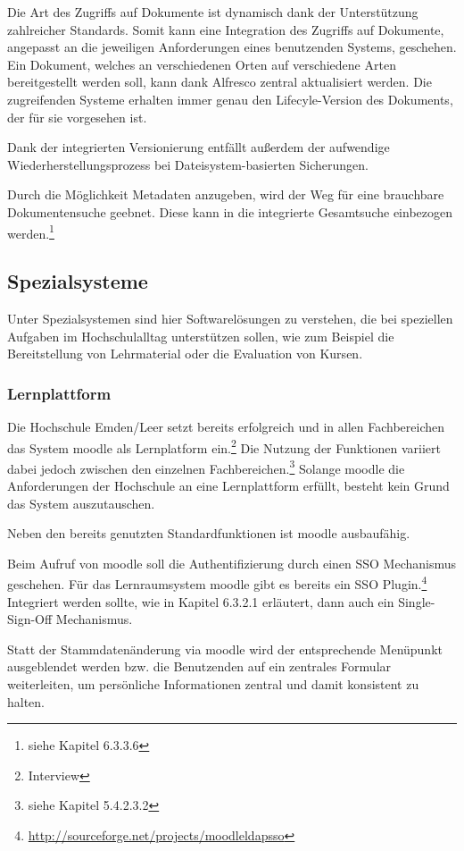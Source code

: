 Die Art des Zugriffs auf Dokumente ist dynamisch dank der Unterstützung zahlreicher Standards. Somit kann eine Integration des Zugriffs auf Dokumente, angepasst an die jeweiligen Anforderungen eines benutzenden Systems, geschehen. Ein Dokument, welches an verschiedenen Orten auf verschiedene Arten bereitgestellt werden soll, kann dank Alfresco zentral aktualisiert werden. Die zugreifenden Systeme erhalten immer genau den Lifecyle-Version des Dokuments, der für sie vorgesehen ist.

Dank der integrierten Versionierung entfällt außerdem der aufwendige Wiederherstellungsprozess bei Dateisystem-basierten Sicherungen.

Durch die Möglichkeit Metadaten anzugeben, wird der Weg für eine brauchbare Dokumentensuche geebnet. Diese kann in die integrierte Gesamtsuche einbezogen werden.\footnote{siehe Kapitel 6.3.3.6}

\subsection{Spezialsysteme}
Unter Spezialsystemen sind hier Softwarelösungen zu verstehen, die bei speziellen Aufgaben im Hochschulalltag unterstützen sollen, wie zum Beispiel die Bereitstellung von Lehrmaterial oder die Evaluation von Kursen.

\subsubsection{Lernplattform}
Die Hochschule Emden/Leer setzt bereits erfolgreich und in allen Fachbereichen das System moodle als Lernplatform ein.\footnote{Interview} Die Nutzung der Funktionen variiert dabei jedoch zwischen den einzelnen Fachbereichen.\footnote{siehe Kapitel 5.4.2.3.2}
Solange moodle die Anforderungen der Hochschule an eine Lernplattform erfüllt, besteht kein Grund das System auszutauschen.

Neben den bereits genutzten Standardfunktionen ist moodle ausbaufähig.

Beim Aufruf von moodle soll die Authentifizierung durch einen SSO Mechanismus geschehen. Für das Lernraumsystem moodle gibt es bereits ein SSO Plugin.\footnote{\url{http://sourceforge.net/projects/moodleldapsso}} Integriert werden sollte, wie in Kapitel 6.3.2.1 erläutert, dann auch ein Single-Sign-Off Mechanismus.

Statt der Stammdatenänderung via moodle wird der entsprechende Menüpunkt ausgeblendet werden bzw. die Benutzenden auf ein zentrales Formular weiterleiten, um persönliche Informationen zentral und damit konsistent zu halten.


